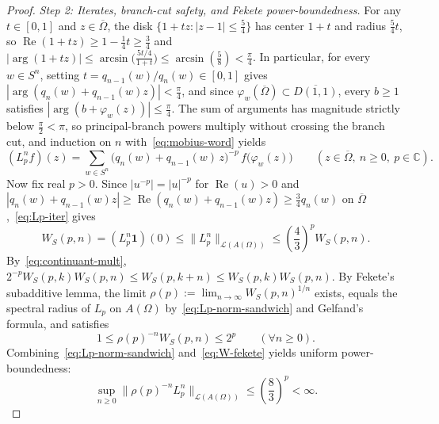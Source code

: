 \documentclass[11pt]{article}
\theoremstyle{definition}
\theoremstyle{remark}
\newcommand{\C}{\mathbb{C}}
\begin{document}
\begin{proof}
\emph{Step 2: Iterates, branch-cut safety, and Fekete power-boundedness.}
For any $t\in[0,1]$ and $z\in\overline\Omega$, the disk
$\{1+tz:|z-1|\le\frac54\}$ has center $1+t$ and radius $\frac54 t$, so
$\operatorname{Re}(1+tz)\ge 1-\frac14 t\ge\frac34$ and
$|\arg(1+tz)|\le\arcsin\!\bigl(\frac{5t/4}{1+t}\bigr)\le\arcsin(\frac58)<\frac{\pi}{4}$.
In particular, for every $w\in S^n$, setting $t=q_{n-1}(w)/q_n(w)\in[0,1]$
gives $|\arg(q_n(w)+q_{n-1}(w)z)|<\frac{\pi}{4}$, and since
$\varphi_w(\overline\Omega)\subset\overline{D(1,1)}$, every $b\ge1$ satisfies
$|\arg(b+\varphi_w(z))|\le\frac{\pi}{4}$. The sum of arguments has magnitude
strictly below $\frac{\pi}{2}<\pi$, so principal-branch powers multiply
without crossing the branch cut, and induction on $n$ with~\eqref{eq:mobius-word}
yields
\begin{equation}\label{eq:Lp-iter}
(L_p^n f)(z)=\sum_{w\in S^n}\bigl(q_n(w)+q_{n-1}(w)\,z\bigr)^{-p}\,f\bigl(\varphi_w(z)\bigr)
\qquad(z\in\overline\Omega,\ n\ge0,\ p\in\C).
\end{equation}
Now fix real $p>0$. Since $|u^{-p}|=|u|^{-p}$ for $\operatorname{Re}(u)>0$
and $|q_n(w)+q_{n-1}(w)z|\ge\operatorname{Re}(q_n(w)+q_{n-1}(w)z)\ge\frac34 q_n(w)$
on $\overline\Omega$,~\eqref{eq:Lp-iter} gives
\begin{equation}\label{eq:Lp-norm-sandwich}
W_S(p,n)=(L_p^n\mathbf 1)(0)\le \|L_p^n\|_{\mathcal L(A(\Omega))}
\le\left(\frac43\right)^p W_S(p,n).
\end{equation}
By~\eqref{eq:continuant-mult}, $2^{-p}W_S(p,k)W_S(p,n)\le W_S(p,k+n)\le W_S(p,k)W_S(p,n)$.
By Fekete's subadditive lemma, the limit $\rho(p):=\lim_{n\to\infty}W_S(p,n)^{1/n}$
exists, equals the spectral radius of $L_p$ on $A(\Omega)$
by~\eqref{eq:Lp-norm-sandwich} and Gelfand's formula, and satisfies
\begin{equation}\label{eq:W-fekete}
1\le \rho(p)^{-n}W_S(p,n)\le 2^p\qquad(\forall n\ge0).
\end{equation}
Combining~\eqref{eq:Lp-norm-sandwich} and~\eqref{eq:W-fekete} yields uniform
power-boundedness:
\begin{equation}\label{eq:power-bounded}
\sup_{n\ge0}\bigl\|\rho(p)^{-n}L_p^n\bigr\|_{\mathcal L(A(\Omega))}
\le\left(\frac83\right)^p<\infty.
\end{equation}


\end{proof}
\end{document}
